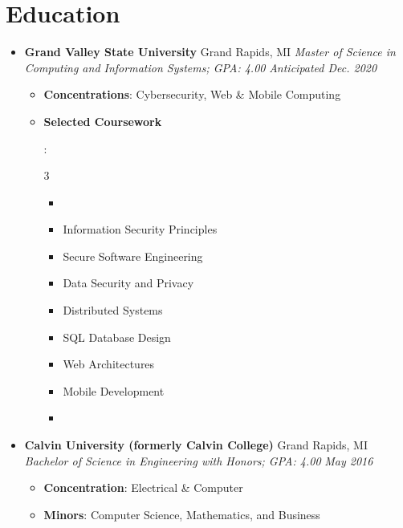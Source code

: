 \documentclass[letterpaper,11pt]{article}
\newcommand{\resumeItem}[2]{
  \item\small{
    \textbf{#1}{: #2 \vspace{-2pt}}
  }
}
\newcommand{\resumeSubheading}[4]{
  \vspace{-1pt}\item
    \textbf{#1} \dotfill #2 \newline
    \textit{\small#3} \hfill \textit{\small #4}
  \vspace{-5pt}
}
\newcommand{\resumeSubHeadingListStart}{\begin{itemize}[leftmargin=*]}
\newcommand{\resumeSubHeadingListEnd}{\end{itemize}}
\newcommand{\resumeItemListStart}{\begin{itemize}}
\newcommand{\resumeItemListEnd}{\end{itemize}\vspace{-5pt}}
\newcommand{\resumeListMulticolStart}[1]{
  \vspace{-2.4em}
  \begin{multicols}{#1}
    \begin{itemize}[label={}]
      \item
}
\newcommand{\resumeListMulticolEnd}{
    \end{itemize}
  \end{multicols}
  \vspace{-10pt}
}
\begin{document}
\section{Education}
  \resumeSubHeadingListStart
    \resumeSubheading
      {Grand Valley State University}{Grand Rapids, MI}
      {Master of Science in Computing and Information Systems; GPA: 4.00}{Anticipated Dec. 2020}
      \resumeItemListStart
        \resumeItem{Concentrations}
          {Cybersecurity, Web \& Mobile Computing}
        \resumeItem{Selected Coursework}
          {
            \resumeListMulticolStart{3}
              \item Information Security Principles
              \item Secure Software Engineering
              \item Data Security and Privacy
              \item Distributed Systems
              \item SQL Database Design
              \item Web Architectures
              \item Mobile Development
              \item %
            \resumeListMulticolEnd
          }
      \resumeItemListEnd
    \resumeSubheading
      {Calvin University (formerly Calvin College)}{Grand Rapids, MI}
      {Bachelor of Science in Engineering with Honors; GPA: 4.00}{May 2016}
      \resumeItemListStart
        \resumeItem{Concentration}
          {Electrical \& Computer}
        \resumeItem{Minors}
          {Computer Science, Mathematics, and Business}
      \resumeItemListEnd
  \resumeSubHeadingListEnd
\end{document}
